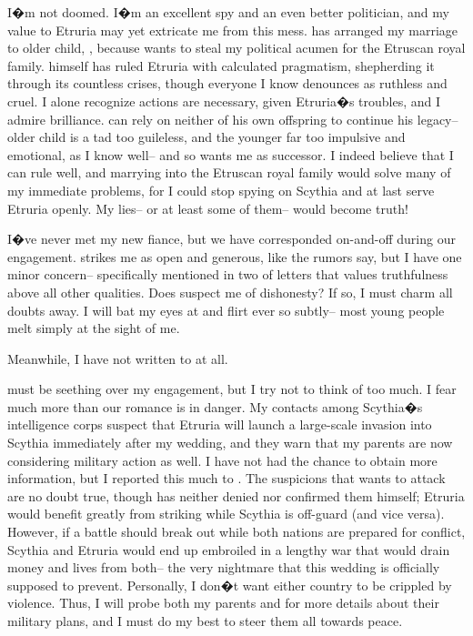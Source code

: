 \documentclass[char]{Kos}
\begin{document}
I�m not doomed. I�m an excellent spy and an even better politician, and my value to Etruria may yet extricate me from this mess. \cEtruriaKing{\nickname} has arranged my marriage to \cEtruriaKing{\their} older child, \cGroom{\nickname}, because \cEtruriaKing{\they} wants to steal my political acumen for the Etruscan royal family. \cEtruriaKing{\They} himself has ruled Etruria with calculated pragmatism, shepherding it through its countless crises, though everyone I know denounces \cEtruriaKing{\them} as ruthless and cruel. I alone recognize \cEtruriaKing{\their} actions are necessary, given Etruria�s troubles, and I admire \cEtruriaKing{\their} brilliance. \cEtruriaKing{\They} can rely on neither of his own offspring to continue his legacy-- \cEtruriaKing{\their} older child is a tad too guileless, and the younger far too impulsive and emotional, as I know well-- and so \cEtruriaKing{\they} wants me as \cEtruriaKing{\their} successor. I indeed believe that I can rule well, and marrying into the Etruscan royal family would solve many of my immediate problems, for I could stop spying on Scythia and at last serve Etruria openly. My lies-- or at least some of them-- would become truth!
	
I�ve never met my new fiance, but we have corresponded on-and-off during our engagement. \cGroom{\They} strikes me as open and generous, like the rumors say, but I have one minor concern-- \cGroom{\they} specifically mentioned in two of \cGroom{\their} letters that \cGroom{\they} values truthfulness above all other qualities. Does \cGroom{\they} suspect me of dishonesty? If so, I must charm all \cGroom{\their} doubts away. I will bat my eyes at \cGroom{\them} and flirt ever so subtly-- most young people melt simply at the sight of me.

Meanwhile, I have not written to \cPoet{\nickname} at all. 

\cPoet{\They} must be seething over my engagement, but I try not to think of \cPoet{\them} too much. I fear much more than our romance is in danger. My contacts among Scythia�s intelligence corps suspect that Etruria will launch a large-scale invasion into Scythia immediately after my wedding, and they warn that my parents are now considering military action as well. I have not had the chance to obtain more information, but I reported this much to \cEtruriaKing{\nickname}. The suspicions that \cEtruriaKing{\they} wants to attack are no doubt true, though \cEtruriaKing{\they} has neither denied nor confirmed them himself; Etruria would benefit greatly from striking while Scythia is off-guard (and vice versa). However, if a battle should break out while both nations are prepared for conflict, Scythia and Etruria would end up embroiled in a lengthy war that would drain money and lives from both-- the very nightmare that this wedding is officially supposed to prevent. Personally, I don�t want either country to be crippled by violence. Thus, I will probe both my parents and \cEtruriaKing{\nickname} for more details about their military plans, and I must do my best to steer them all towards peace.
\end{document}
